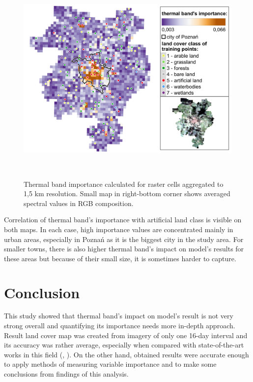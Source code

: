 \documentclass{amuthesis}
\begin{document}
\begin{figure}[H]

{\centering \includegraphics[width=5.875in,height=4.16667in]{./figures/B10_importance-spatial-ENG2.png}

}

\caption{\label{fig-rycina18}Thermal band importance calculated for
raster cells aggregated to 1,5 km resolution. Small map in right-bottom
corner shows averaged spectral values in RGB composition.}

\end{figure}

Correlation of thermal band's importance with artificial land class is
visible on both maps. In each case, high importance values are
concentrated mainly in urban areas, especially in Poznań as it is the
biggest city in the study area. For smaller towns, there is also higher
thermal band's impact on model's results for these areas but because of
their small size, it is sometimes harder to capture.


\hypertarget{conclusion}{%
\chapter{Conclusion}\label{conclusion}}

This study showed that thermal band's impact on model's result is not
very strong overall and quantifying its importance needs more in-depth
approach. Result land cover map was created from imagery of only one
16-day interval and its accuracy was rather average, especially when
compared with state-of-the-art works in this field
(\textcite{malinowski_automated_2020},
\textcite{witjes_spatiotemporal_2021}). On the other hand, obtained
results were accurate enough to apply methods of measuring variable
importance and to make some conclusions from findings of this analysis.
\end{document}
